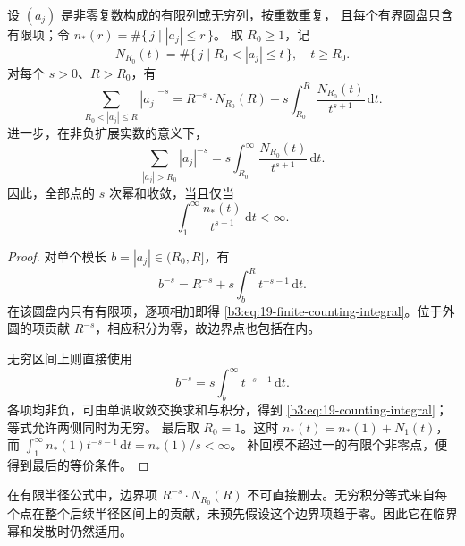 \begin{proposition}[幂和与计数积分]\label{b3:prop:19-counting-integral}
设 \((a_j)\) 是非零复数构成的有限列或无穷列，按重数重复，
且每个有界圆盘只含有限项；令 \(n_*(r)=\#\{\,j\mid |a_j|\le r\,\}\)。
取 \(R_0\ge1\)，记
\[
 N_{R_0}(t)=\#\{\,j\mid R_0<|a_j|\le t\,\},\quad t\ge R_0.
\]
对每个 \(s>0\)、\(R>R_0\)，有
\begin{equation}\label{b3:eq:19-finite-counting-integral}
 \sum_{R_0<|a_j|\le R}|a_j|^{-s}
 =R^{-s}\cdot N_{R_0}(R)
   +s\int_{R_0}^R\frac{N_{R_0}(t)}{t^{s+1}}\,\mathrm dt.
\end{equation}
进一步，在非负扩展实数的意义下，
\begin{equation}\label{b3:eq:19-counting-integral}
 \sum_{|a_j|>R_0}|a_j|^{-s}
 =s\int_{R_0}^{\infty}\frac{N_{R_0}(t)}{t^{s+1}}\,\mathrm dt.
\end{equation}
因此，全部点的 \(s\) 次幂和收敛，当且仅当
\[
 \int_1^\infty\frac{n_*(t)}{t^{s+1}}\,\mathrm dt<\infty.
\]
\end{proposition}
\begin{proof}
对单个模长 \(b=|a_j|\in(R_0,R]\)，有
\[
 b^{-s}=R^{-s}+s\int_b^R t^{-s-1}\,\mathrm dt.
\]
在该圆盘内只有有限项，逐项相加即得
\eqref{b3:eq:19-finite-counting-integral}。位于外圆的项贡献 \(R^{-s}\)，相应积分为零，故边界点也包括在内。

无穷区间上则直接使用
\[
 b^{-s}=s\int_b^\infty t^{-s-1}\,\mathrm dt.
\]
各项均非负，可由单调收敛交换求和与积分，得到
\eqref{b3:eq:19-counting-integral}；等式允许两侧同时为无穷。
最后取 \(R_0=1\)。这时 \(n_*(t)=n_*(1)+N_1(t)\)，而
\(\int_1^\infty n_*(1)t^{-s-1}\,\mathrm dt=n_*(1)/s<\infty\)。
补回模不超过一的有限个非零点，便得到最后的等价条件。
\end{proof}

在有限半径公式中，边界项 \(R^{-s}\cdot N_{R_0}(R)\) 不可直接删去。无穷积分等式来自每个点在整个后续半径区间上的贡献，未预先假设这个边界项趋于零。因此它在临界幂和发散时仍然适用。

